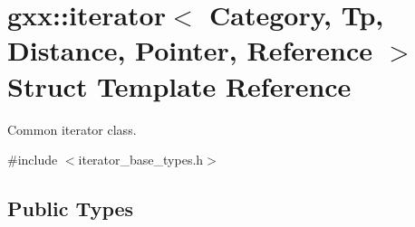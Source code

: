 \hypertarget{structgxx_1_1iterator}{}\section{gxx\+:\+:iterator$<$ Category, Tp, Distance, Pointer, Reference $>$ Struct Template Reference}
\label{structgxx_1_1iterator}


Common iterator class.  




{\ttfamily \#include $<$iterator\+\_\+base\+\_\+types.\+h$>$}

\subsection*{Public Types}
